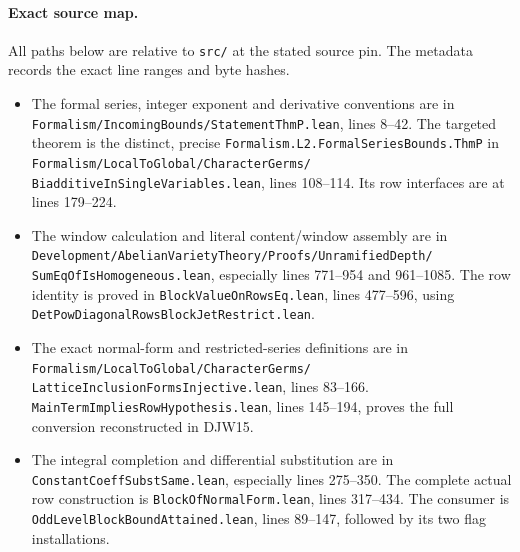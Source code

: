 \documentclass[11pt,a4paper]{article}
\numberwithin{equation}{section}
\theoremstyle{remark}\newtheorem{remark}[theorem]{Remark}
\begin{document}
\paragraph{Exact source map.}
All paths below are relative to \texttt{src/\allowbreak } at the stated source
pin.  The metadata records the exact line ranges and byte hashes.
\begin{itemize}
\item The formal series, integer exponent and derivative conventions
are in
\texttt{Formalism/\allowbreak Incoming\allowbreak Bounds/\allowbreak Statement\allowbreak Thm\allowbreak P.\allowbreak lean}, lines 8--42.
The targeted theorem is the distinct, precise
\nolinkurl{Formalism.L2.FormalSeriesBounds.ThmP} in
\texttt{Formalism/\allowbreak Local\allowbreak To\allowbreak Global/\allowbreak Character\allowbreak Germs/\allowbreak }
\texttt{Biadditive\allowbreak In\allowbreak Single\allowbreak Variables.\allowbreak lean}, lines 108--114.
Its row interfaces are at lines 179--224.
\item The window calculation and literal content/window assembly are
in \texttt{Development/\allowbreak Abelian\allowbreak Variety\allowbreak Theory/\allowbreak Proofs/\allowbreak Unramified\allowbreak Depth/\allowbreak }
\texttt{Sum\allowbreak Eq\allowbreak Of\allowbreak Is\allowbreak Homogeneous.\allowbreak lean}, especially lines 771--954 and
961--1085.  The row identity is proved in
\texttt{Block\allowbreak Value\allowbreak On\allowbreak Rows\allowbreak Eq.\allowbreak lean}, lines 477--596, using
\texttt{Det\allowbreak Pow\allowbreak Diagonal\allowbreak Rows\allowbreak Block\allowbreak Jet\allowbreak Restrict.\allowbreak lean}.
\item The exact normal-form and restricted-series definitions are in
\texttt{Formalism/\allowbreak Local\allowbreak To\allowbreak Global/\allowbreak Character\allowbreak Germs/\allowbreak }
\texttt{Lattice\allowbreak Inclusion\allowbreak Forms\allowbreak Injective.\allowbreak lean}, lines 83--166.
\texttt{Main\allowbreak Term\allowbreak Implies\allowbreak Row\allowbreak Hypothesis.\allowbreak lean}, lines 145--194, proves
the full conversion reconstructed in DJW15.
\item The integral completion and differential substitution are in
\texttt{Constant\allowbreak Coeff\allowbreak Subst\allowbreak Same.\allowbreak lean}, especially lines 275--350.
The complete actual row construction is
\texttt{Block\allowbreak Of\allowbreak Normal\allowbreak Form.\allowbreak lean}, lines 317--434.
The consumer is \texttt{Odd\allowbreak Level\allowbreak Block\allowbreak Bound\allowbreak Attained.\allowbreak lean},
lines 89--147, followed by its two flag installations.
\end{itemize}
\end{document}
